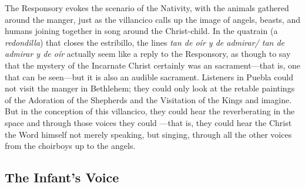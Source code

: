 The Responsory evokes the scenario of the Nativity, with the animals gathered
around the manger, just as the villancico calls up the image of angels, beasts,
and humans joining together in song around the Christ-child.
In the quatrain (a \emph{redondilla}) that closes the estribillo, the lines
\emph{tan de oír y de admirar/ tan de admirar y de oír} actually seem like a
reply to the Responsory, as though to say that the mystery of the Incarnate
Christ certainly was an  sacrament---that is, one that can be
seen---but it is also an audible sacrament.
Listeners in Puebla could not visit the manger in Bethlehem; they could only
look at the retable paintings of the Adoration of the Shepherds and the
Visitation of the Kings and imagine.
But in the conception of this villancico, they could hear the  reverberating in the space and through those voices they could
---that is,
they could hear the Christ the Word himself not merely speaking, but singing,
through all the other voices from the choirboys up to the angels.

\subsection{The Infant's Voice}

